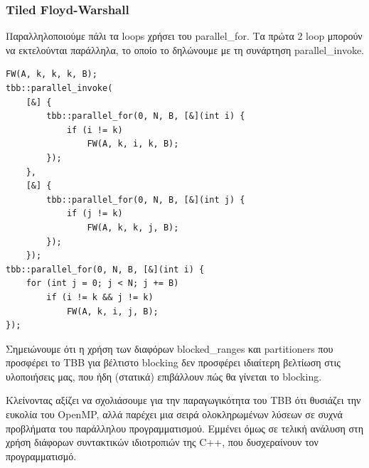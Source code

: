 \documentclass[12pt,titlepage]{article}
\begin{document}
\subsubsection*{Tiled Floyd-Warshall}

Παραλληλοποιούμε πάλι τα loops χρήσει του parallel\_for. Τα πρώτα 2 loop μπορούν
να εκτελούνται παράλληλα, το οποίο το δηλώνουμε με τη συνάρτηση
parallel\_invoke.

\begin{verbatim}
FW(A, k, k, k, B);
tbb::parallel_invoke(
    [&] {
        tbb::parallel_for(0, N, B, [&](int i) {
            if (i != k)
                FW(A, k, i, k, B);
        });
    },
    [&] {
        tbb::parallel_for(0, N, B, [&](int j) {
            if (j != k)
                FW(A, k, k, j, B);
        });
    });
tbb::parallel_for(0, N, B, [&](int i) {
    for (int j = 0; j < N; j += B)
        if (i != k && j != k)
            FW(A, k, i, j, B);
});
\end{verbatim}

Σημειώνουμε ότι η χρήση των διαφόρων blocked\_ranges και partitioners που
προσφέρει  το TBB για βέλτιστο blocking δεν προσφέρει ιδιαίτερη βελτίωση στις
υλοποιήσεις μας, που ήδη (στατικά) επιβάλλουν πώς θα γίνεται το blocking.

Κλείνοντας αξίζει να σχολιάσουμε για την παραγωγικότητα του TBB ότι θυσιάζει την
ευκολία του OpenMP, αλλά παρέχει μια σειρά ολοκληρωμένων λύσεων σε συχνά
προβλήματα του παράλληλου προγραμματισμού. Εμμένει όμως σε τελική ανάλυση στη
χρήση διάφορων συντακτικών ιδιοτροπιών της C++, που δυσχεραίνουν τον
προγραμματισμό.
\end{document}

